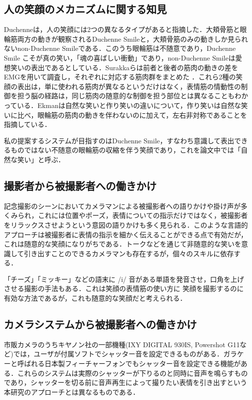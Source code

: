 \documentclass[report,10pt,uplatex,titlepage]{jsarticle}
\begin{document}
\subsection{人の笑顔のメカニズムに関する知見}

Duchenneは，人の笑顔には2つの異なるタイプがあると指摘した．大頬骨筋と眼輪筋両方の動きが観察されるDuchenne Smileと，大頬骨筋のみの動きしか見られないnon-Duchenne Smileである\cite{de1990mechanism}．このうち眼輪筋は不随意であり，Duchenne Smile こそが真の笑い，「魂の喜ばしい衝動」であり，non-Duchenne Smileは愛想笑いの表出であるとしている．Surakkaらは前者と後者の筋肉の動きの差をEMGを用いて調査し，それぞれに対応する筋肉群をまとめた \cite{surakka1998facial}．これら2種の笑顔の表出は，単に使われる筋肉が異なるというだけはなく，表情筋の情動性の制御を担う脳の経路は，同じ筋肉の随意的な制御を担う部位とは異なることもわかっている\cite{tanaka201007}．Ekmanは自然な笑いと作り笑いの違いについて，作り笑いは自然な笑いに比べ，眼輪筋の筋肉の動きを伴わないのに加えて，左右非対称であることを指摘している\cite{ekman2009telling}．

私の提案するシステムが目指すのはDuchenne Smile，すなわち意識して表出できるものではない不随意の眼輪筋の収縮を伴う笑顔であり，これを論文中では「自然な笑い」と呼ぶ．

\subsection{撮影者から被撮影者への働きかけ}

記念撮影のシーンにおいてカメラマンによる被撮影者への語りかけや掛け声が多くみられ，これには位置やポーズ，表情についての指示だけではなく，被撮影者をリラックスさせようという意図の語りかけも多く見られる．このような言語的アプローチは被撮影者に表情の指示を細かく伝えることができる点で有効だが，これは随意的な笑顔になりがちである．トークなどを通じて非随意的な笑いを意識して引き出すことのできるカメラマンも存在するが，個々のスキルに依存する．

「チーズ」「ミッキー」などの語末に /i/ 音がある単語を発音させ，口角を上げさせる撮影の手法もある．これは笑顔の表情筋の使い方に
笑顔を撮影するのに有効な方法であるが，これも随意的な笑顔だと考えられる．

\subsection{カメラシステムから被撮影者への働きかけ}



市販カメラのうちキヤノン社の一部機種(IXY DIGITAL 930IS, Powershot G11など)では，ユーザが付属ソフトでシャッター音を設定できるものがある\cite{PowershotG1X}．ガラケーと呼ばれる日本製フィーチャーフォンでもシャッター音を設定できる機能がある．これらのシステムは実際のシャッターが下りるのと同時に音声を鳴らすものであり，シャッターを切る前に音声再生によって撮りたい表情を引き出すという本研究のアプローチとは異なるものである．
\end{document}
